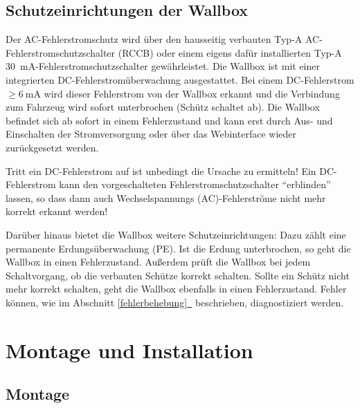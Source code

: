 \documentclass[a4paper,10pt]{article}
\newcommand{\hint}[1]{\begin{tcolorbox}[colback=boxgray,colframe=black,coltext=
white,title=Hinweis,left*=2mm,right*=2mm,boxsep=1mm,bottom=1mm,top=1mm]#1\end{tcolorbox}}
\newcommand*{\fullref}[1]{Abschnitt \hyperref[{#1}]{\ref*{#1}~\nameref*{#1}}}
\begin{document}
\begin{multicols*}{2}
    \subsection{Schutzeinrichtungen der Wallbox}\label{dcerrorhint}
    Der AC-Fehlerstromschutz wird über den hausseitig verbauten
    Typ-A AC-Fehlerstromschutzschalter (RCCB) oder einem eigens dafür installierten
    Typ-A \SI{30}{\milli\ampere}-Fehlerstromschutzschalter gewährleistet. Die Wallbox ist
    mit einer integrierten DC-Fehlerstromüberwachung ausgestattet.
    Bei einem DC-Fehlerstrom $\geq \SI{6}{\milli\ampere}$ wird dieser
    Fehlerstrom von der Wallbox erkannt und die Verbindung zum Fahrzeug wird sofort
    unterbrochen (Schütz schaltet ab). Die Wallbox befindet sich ab sofort in einem
    Fehlerzustand und kann erst durch Aus- und Einschalten der
    Stromversorgung oder über das Webinterface wieder zurückgesetzt werden.
    \hint{Tritt ein DC-Fehlerstrom auf ist unbedingt die Ursache zu
    ermitteln! Ein DC-Fehlerstrom kann den vorgeschalteten Fehlerstromschutzschalter
    \enquote{erblinden} lassen, so dass dann auch Wechselspannungs
    (AC)-Fehlerströme nicht mehr korrekt erkannt werden!}

    Darüber hinaus bietet die Wallbox weitere Schutzeinrichtungen: Dazu zählt eine
    permanente Erdungsüberwachung (PE). Ist die Erdung unterbrochen, so geht die
    Wallbox in einen Fehlerzustand. Außerdem prüft die Wallbox bei jedem
    Schaltvorgang, ob die verbauten Schütze korrekt schalten. Sollte ein
    Schütz nicht mehr korrekt schalten, geht die Wallbox ebenfalls in einen Fehlerzustand.
    Fehler können, wie im \fullref{fehlerbehebung} beschrieben, diagnostiziert werden.

    \newpage
    \section{Montage und Installation}
    \subsection{Montage}

\end{multicols*}
\end{document}
